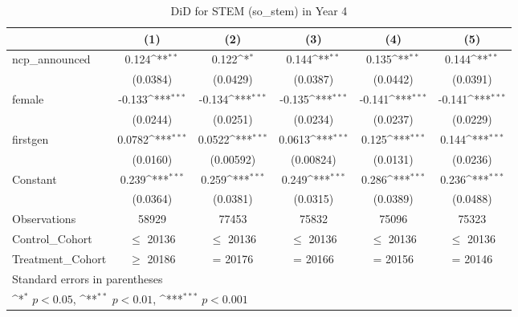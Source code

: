 \begin{table}[htbp]\centering
\def\sym#1{\ifmmode^{#1}\else\(^{#1}\)\fi}
\caption{DiD for STEM (so\_stem) in Year 4}
\begin{tabular}{l*{5}{c}}
\toprule
                &\multicolumn{1}{c}{(1)}         &\multicolumn{1}{c}{(2)}         &\multicolumn{1}{c}{(3)}         &\multicolumn{1}{c}{(4)}         &\multicolumn{1}{c}{(5)}         \\
\midrule
ncp\_announced   &    0.124\sym{**} &    0.122\sym{*}  &    0.144\sym{**} &    0.135\sym{**} &    0.144\sym{**} \\
                & (0.0384)         & (0.0429)         & (0.0387)         & (0.0442)         & (0.0391)         \\
\addlinespace
female          &   -0.133\sym{***}&   -0.134\sym{***}&   -0.135\sym{***}&   -0.141\sym{***}&   -0.141\sym{***}\\
                & (0.0244)         & (0.0251)         & (0.0234)         & (0.0237)         & (0.0229)         \\
\addlinespace
firstgen        &   0.0782\sym{***}&   0.0522\sym{***}&   0.0613\sym{***}&    0.125\sym{***}&    0.144\sym{***}\\
                & (0.0160)         &(0.00592)         &(0.00824)         & (0.0131)         & (0.0236)         \\
\addlinespace
Constant        &    0.239\sym{***}&    0.259\sym{***}&    0.249\sym{***}&    0.286\sym{***}&    0.236\sym{***}\\
                & (0.0364)         & (0.0381)         & (0.0315)         & (0.0389)         & (0.0488)         \\
\midrule
Observations    &    58929         &    77453         &    75832         &    75096         &    75323         \\
Control\_Cohort  &$\le$ 20136         &$\le$ 20136         &$\le$ 20136         &$\le$ 20136         &$\le$ 20136         \\
Treatment\_Cohort&$\ge$ 20186         &  = 20176         &  = 20166         &  = 20156         &  = 20146         \\
\bottomrule
\multicolumn{6}{l}{\footnotesize Standard errors in parentheses}\\
\multicolumn{6}{l}{\footnotesize \sym{*} \(p<0.05\), \sym{**} \(p<0.01\), \sym{***} \(p<0.001\)}\\
\end{tabular}
\end{table}

